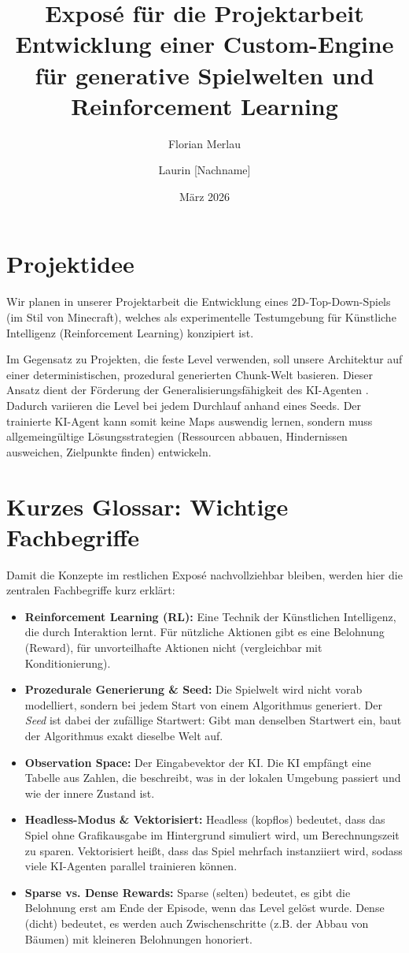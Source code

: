 \documentclass[12pt,a4paper]{article}
\title{\textbf{Expos\'e f\"ur die Projektarbeit} \\ Entwicklung einer Custom-Engine f\"ur generative Spielwelten und Reinforcement Learning}
\author{Florian Merlau \and Laurin [Nachname]}
\date{M\"arz 2026}
\begin{document}
\maketitle

\section{Projektidee}
Wir planen in unserer Projektarbeit die Entwicklung eines 2D-Top-Down-Spiels (im Stil von Minecraft), welches als experimentelle Testumgebung f\"ur K\"unstliche Intelligenz (Reinforcement Learning) konzipiert ist. 

Im Gegensatz zu Projekten, die feste Level verwenden, soll unsere Architektur auf einer deterministischen, prozedural generierten \glqq Chunk\grqq-Welt basieren. Dieser Ansatz dient der F\"orderung der Generalisierungsf\"ahigkeit des KI-Agenten \cite{cobbe2020procgen, risi2020increasing}. Dadurch variieren die Level bei jedem Durchlauf anhand eines Seeds. Der trainierte KI-Agent kann somit keine Maps auswendig lernen, sondern muss allgemeing\"ultige L\"osungsstrategien (Ressourcen abbauen, Hindernissen ausweichen, Zielpunkte finden) entwickeln.

\section{Kurzes Glossar: Wichtige Fachbegriffe}
Damit die Konzepte im restlichen Expos\'e nachvollziehbar bleiben, werden hier die zentralen Fachbegriffe kurz erkl\"art:
\begin{itemize}
    \item \textbf{Reinforcement Learning (RL):} Eine Technik der K\"unstlichen Intelligenz, die durch Interaktion lernt. F\"ur n\"utzliche Aktionen gibt es eine Belohnung (Reward), f\"ur unvorteilhafte Aktionen nicht (vergleichbar mit Konditionierung).
    \item \textbf{Prozedurale Generierung \& Seed:} Die Spielwelt wird nicht vorab modelliert, sondern bei jedem Start von einem Algorithmus generiert. Der \textit{Seed} ist dabei der zuf\"allige Startwert: Gibt man denselben Startwert ein, baut der Algorithmus exakt dieselbe Welt auf.
    \item \textbf{Observation Space:} Der Eingabevektor der KI. Die KI empf\"angt eine Tabelle aus Zahlen, die beschreibt, was in der lokalen Umgebung passiert und wie der innere Zustand ist.
    \item \textbf{Headless-Modus \& Vektorisiert:} \glqq Headless\grqq{} (kopflos) bedeutet, dass das Spiel ohne Grafikausgabe im Hintergrund simuliert wird, um Berechnungszeit zu sparen. \glqq Vektorisiert\grqq{} hei\ss{}t, dass das Spiel mehrfach instanziiert wird, sodass viele KI-Agenten parallel trainieren k\"onnen.
    \item \textbf{Sparse vs. Dense Rewards:} \glqq Sparse\grqq{} (selten) bedeutet, es gibt die Belohnung erst am Ende der Episode, wenn das Level gel\"ost wurde. \glqq Dense\grqq{} (dicht) bedeutet, es werden auch Zwischenschritte (z.B. der Abbau von B\"aumen) mit kleineren Belohnungen honoriert.
\end{itemize}
\end{document}
